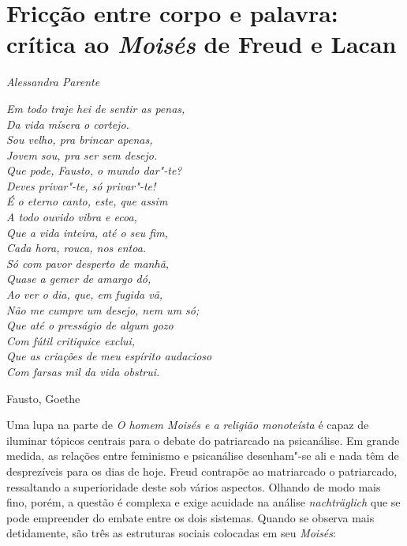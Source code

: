 \chapter*{Fricção entre corpo e palavra: crítica ao \emph{Moisés} de Freud e Lacan}

\begin{flushright}
\emph{Alessandra Parente}
\end{flushright}

\epigraph{\emph{Em todo traje hei de sentir as penas,\\
Da vida mísera o cortejo.\\
Sou velho, pra brincar apenas,\\
Jovem sou, pra ser sem desejo.\\
Que pode, Fausto, o mundo dar"-te?\\
Deves privar"-te, só privar"-te!\\
É o eterno canto, este, que assim\\
A todo ouvido vibra e ecoa,\\
Que a vida inteira, até o seu fim,\\
Cada hora, rouca, nos entoa.\\
Só com pavor desperto de manhã,\\
Quase a gemer de amargo dó,\\
Ao ver o dia, que, em fugida vã,\\
Não me cumpre um desejo, nem um só;\\
Que até o presságio de algum gozo\\
Com fútil critiquice exclui,\\
Que as criações de meu espírito audacioso\\
Com farsas mil da vida obstrui.}}{Fausto, Goethe}

Uma lupa na parte  de \emph{O homem Moisés e a religião monoteísta} é
capaz de iluminar tópicos centrais para o debate do patriarcado na
psicanálise. Em grande medida, as relações entre feminismo e psicanálise
desenham"-se ali e nada têm de desprezíveis para os dias de hoje. Freud
contrapõe ao matriarcado o patriarcado, ressaltando a superioridade
deste sob vários aspectos. Olhando de modo mais fino, porém, a questão é
complexa e exige acuidade na análise \emph{nachträglich} que se pode
empreender do embate entre os dois sistemas. Quando se observa mais
detidamente, são três as estruturas sociais colocadas em seu
\emph{Moisés}:

